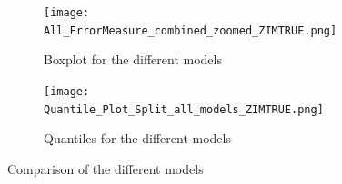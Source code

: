 \begin{figure}[htb!]
\centering
\begin{subfigure}[b]{0.8\textwidth}
\texttt{[image: All\_ErrorMeasure\_combined\_zoomed\_ZIMTRUE.png]}
\caption{Boxplot for the different models}
\label{fig:box distributions models Zim}
\end{subfigure}
\hfill
\begin{subfigure}[b]{0.8\textwidth}
\texttt{[image: Quantile\_Plot\_Split\_all\_models\_ZIMTRUE.png]}
\caption{Quantiles for the different models}
\label{fig: quantile distributions models Zim}
\end{subfigure}
\hfill
\caption{Comparison of the different models }
\label{fig:models Comp2}
\end{figure}

%
%
%
%
%

